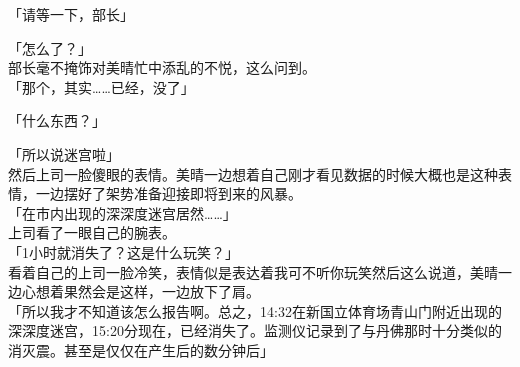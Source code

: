 「请等一下，部长」

「怎么了？」\\

部长毫不掩饰对美晴忙中添乱的不悦，这么问到。\\

「那个，其实……已经，没了」

「什么东西？」

「所以说迷宫啦」\\

然后上司一脸傻眼的表情。美晴一边想着自己刚才看见数据的时候大概也是这种表情，一边摆好了架势准备迎接即将到来的风暴。\\

「在市内出现的深深度迷宫居然……」\\

上司看了一眼自己的腕表。\\

「1小时就消失了？这是什么玩笑？」\\

看着自己的上司一脸冷笑，表情似是表达着我可不听你玩笑然后这么说道，美晴一边心想着果然会是这样，一边放下了肩。\\

「所以我才不知道该怎么报告啊。总之，14:32在新国立体育场青山门附近出现的深深度迷宫，15:20分现在，已经消失了。监测仪记录到了与丹佛那时十分类似的消灭震。甚至是仅仅在产生后的数分钟后」\\

